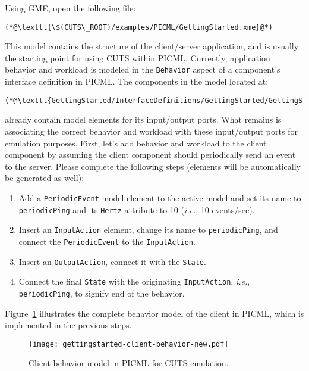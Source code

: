 Using GME, open the following file: 
\begin{lstlisting}
(*@\texttt{\$(CUTS\_ROOT)/examples/PICML/GettingStarted.xme}@*)
\end{lstlisting}
This model contains the structure of the client/\-server application, and 
is usually the starting point for using CUTS within PICML. 
Currently, application behavior and workload is modeled in the \texttt{Behavior}
aspect of a component's interface definition in PICML. The components in the model
located at:
\begin{lstlisting}
(*@\texttt{GettingStarted/InterfaceDefinitions/GettingStarted/GettingStarted}@*)
\end{lstlisting}
already contain model elements for its input/\-output ports. What remains is associating
the correct behavior and workload with these input/\-output ports for emulation
purposes. First, let's add behavior and workload to the client component by 
assuming the client component should periodically send an event to the server.
Please complete the following steps (elements will be automatically be generated
as well):
\begin{enumerate}
  \item Add a \texttt{PeriodicEvent} model element to the active model and 
  set its name to \texttt{periodicPing} and its \texttt{Hertz} attribute to 
  10 (\textit{i.e.}, 10 events/sec). 
  
  \item Insert an \texttt{InputAction} element, change its name to 
  \texttt{periodicPing}, and connect the \texttt{PeriodicEvent} to 
  the \texttt{InputAction}.

  \item Insert an \texttt{OutputAction}, connect it with the \texttt{State}.

  \item Connect the final \texttt{State} with the originating \texttt{InputAction},
  \textit{i.e.}, \texttt{periodicPing}, to signify end of the behavior.
\end{enumerate}
Figure~\ref{fig:gettingstarted-client-behavior} illustrates the complete behavior 
model of the client in PICML, which is implemented in the previous steps.
\begin{figure}[htbp]
  \centering
  \texttt{[image: gettingstarted-client-behavior-new.pdf]}
  \caption{Client behavior model in PICML for CUTS emulation.}
  \label{fig:gettingstarted-client-behavior}
\end{figure}

